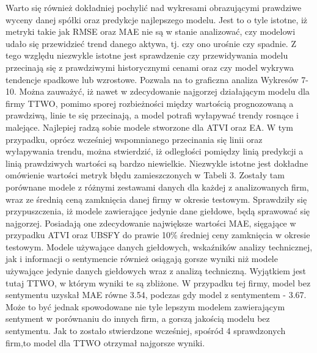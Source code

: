 \documentclass[review]{elsarticle} %
\begin{document}
Warto się również dokładniej pochylić nad wykresami obrazującymi prawdziwe wyceny danej spółki oraz predykcje najlepszego modelu. Jest to o tyle istotne, iż metryki takie jak RMSE oraz MAE nie są w stanie analizować, czy modelowi udało się przewidzieć trend danego aktywa, tj. czy ono urośnie czy spadnie. Z tego względu niezwykle istotne jest sprawdzenie czy przewidywania modelu przecinają się z prawdziwymi historycznymi cenami oraz czy model wykrywa tendencje spadkowe lub wzrostowe. Pozwala na to graficzna analiza Wykresów 7-10. Można zauważyć, iż nawet w zdecydowanie najgorzej działającym modelu dla firmy TTWO, pomimo sporej rozbieżności między wartością prognozowaną a prawdziwą, linie te się przecinają, a model potrafi wyłapywać trendy rosnące i malejące. Najlepiej radzą sobie modele stworzone dla ATVI oraz EA. W tym przypadku, oprócz wcześniej wspomnianego przecinania się linii oraz wyłapywania trendu, można stwierdzić, iż odległości pomiędzy linią predykcji a linią prawdziwych wartości są bardzo niewielkie. 
Niezwykle istotne jest dokładne omówienie wartości metryk błędu zamieszczonych  w Tabeli 3. Zostały tam porównane modele z różnymi zestawami danych dla każdej z analizowanych firm, wraz ze średnią ceną zamknięcia danej firmy w okresie testowym. Sprawdziły się przypuszczenia, iż modele zawierające jedynie dane giełdowe, będą sprawować się najgorzej. Posiadają one zdecydowanie największe wartości MAE, sięgające w przypadku ATVI oraz UBSFY do prawie 10\% średniej ceny zamknięcia w okresie testowym. Modele używające danych giełdowych, wskaźników analizy technicznej, jak i informacji o sentymencie również osiągają gorsze wyniki niż modele używające jedynie danych giełdowych wraz z analizą techniczną. Wyjątkiem jest tutaj TTWO, w którym wyniki te są zbliżone. W przypadku tej firmy, model bez sentymentu uzyskał MAE równe 3.54, podczas gdy model z sentymentem - 3.67. Może to być jednak spowodowane nie tyle lepszym modelem zawierającym sentyment w porównaniu do innych firm, a gorszą jakością modelu bez sentymentu. Jak to zostało stwierdzone wcześniej, spośród 4 sprawdzonych firm,to model dla TTWO otrzymał najgorsze wyniki.
\end{document}
